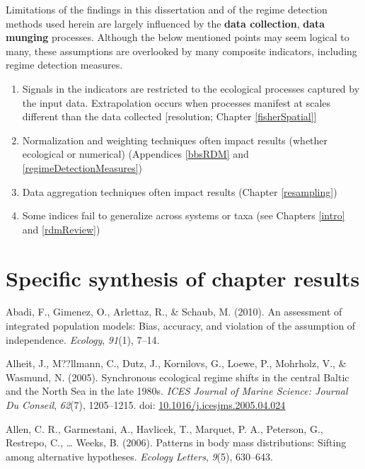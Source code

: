\documentclass[12pt,twoside,openany]{reedthesis}
\providecommand{\tightlist}{%
  \setlength{\itemsep}{0pt}\setlength{\parskip}{0pt}}
\begin{document}
Limitations of the findings in this dissertation and of the regime detection methods used herein are largely influenced by the \textbf{data collection}, \textbf{data munging} processes. Although the below mentioned points may seem logical to many, these assumptions are overlooked by many composite indicators, including regime detection measures.
\begin{enumerate}
\def\labelenumi{\arabic{enumi}.}
\tightlist
\item
  Signals in the indicators are restricted to the ecological processes captured by the input data. Extrapolation occurs when processes manifest at scales different than the data collected {[}resolution; Chapter \ref{fisherSpatial}{]}\\
\item
  Normalization and weighting techniques often impact results (whether ecological or numerical) (Appendices \ref{bbsRDM} and \ref{regimeDetectionMeasures})\\
\item
  Data aggregation techniques often impact results (Chapter \ref{resampling})\\
\item
  Some indices fail to generalize across systems or taxa (see Chapters \ref{intro} and \ref{rdmReview})
\end{enumerate}
\hypertarget{specific-synthesis-of-chapter-results}{%
\section{Specific synthesis of chapter results}\label{specific-synthesis-of-chapter-results}}

\hypertarget{refs}{}
\leavevmode\hypertarget{ref-abadi2010assessment}{}%
Abadi, F., Gimenez, O., Arlettaz, R., \& Schaub, M. (2010). An assessment of integrated population models: Bias, accuracy, and violation of the assumption of independence. \emph{Ecology}, \emph{91}(1), 7--14.

\leavevmode\hypertarget{ref-alheit_synchronous_2005}{}%
Alheit, J., M??llmann, C., Dutz, J., Kornilovs, G., Loewe, P., Mohrholz, V., \& Wasmund, N. (2005). Synchronous ecological regime shifts in the central Baltic and the North Sea in the late 1980s. \emph{ICES Journal of Marine Science: Journal Du Conseil}, \emph{62}(7), 1205--1215. doi: \href{https://doi.org/10.1016/j.icesjms.2005.04.024}{10.1016/j.icesjms.2005.04.024}

\leavevmode\hypertarget{ref-allen2006patterns}{}%
Allen, C. R., Garmestani, A., Havlicek, T., Marquet, P. A., Peterson, G., Restrepo, C., \ldots{} Weeks, B. (2006). Patterns in body mass distributions: Sifting among alternative hypotheses. \emph{Ecology Letters}, \emph{9}(5), 630--643.
\end{document}
